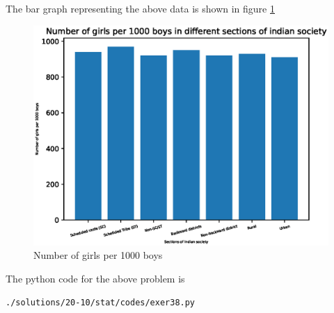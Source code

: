  The bar graph representing the above data is shown in figure \ref{fig:bar38_py}\\
\begin{figure}[!ht]
\centering
\includegraphics[width=\columnwidth]{./solutions/20-10/stat/codes/pyfigs/exer38.eps}
\caption{Number of girls per 1000 boys}
\label{fig:bar38_py}
\end{figure}
The python code for the above problem is 
\begin{lstlisting}
./solutions/20-10/stat/codes/exer38.py
\end{lstlisting}

